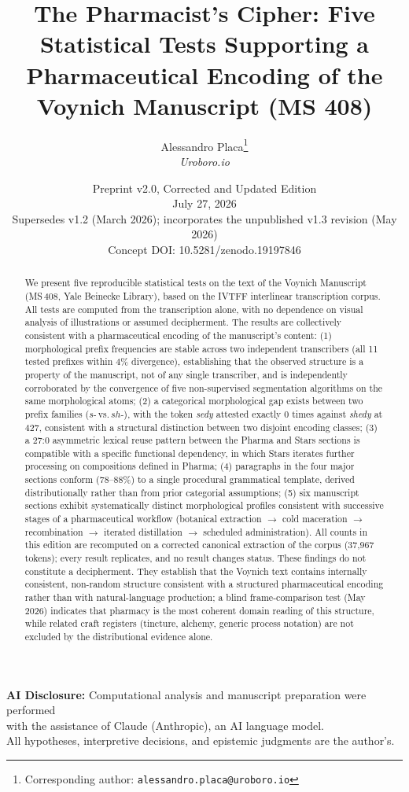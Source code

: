 \documentclass[11pt,a4paper]{article}
\title{The Pharmacist's Cipher: Five Statistical Tests Supporting a Pharmaceutical Encoding of the Voynich Manuscript (MS 408)}
\author{Alessandro Placa\thanks{Corresponding author: \texttt{alessandro.placa@uroboro.io}}\\
\textit{Uroboro.io}}
\date{Preprint v2.0, Corrected and Updated Edition\\[0.3em]
\small July 27, 2026\\[0.5em]
\small Supersedes v1.2 (March 2026); incorporates the unpublished v1.3 revision (May 2026)\\
\small Concept DOI: 10.5281/zenodo.19197846}
\begin{document}
\maketitle

\begin{center}
\small
\textbf{AI Disclosure:} Computational analysis and manuscript preparation were performed\\
with the assistance of Claude (Anthropic), an AI language model.\\
All hypotheses, interpretive decisions, and epistemic judgments are the author's.
\end{center}

\begin{abstract}
We present five reproducible statistical tests on the text of the Voynich Manuscript (MS\,408, Yale Beinecke Library), based on the IVTFF interlinear transcription corpus. All tests are computed from the transcription alone, with no dependence on visual analysis of illustrations or assumed decipherment. The results are collectively consistent with a pharmaceutical encoding of the manuscript's content: (1) morphological prefix frequencies are stable across two independent transcribers (all 11 tested prefixes within 4\% divergence), establishing that the observed structure is a property of the manuscript, not of any single transcriber, and is independently corroborated by the convergence of five non-supervised segmentation algorithms on the same morphological atoms; (2) a categorical morphological gap exists between two prefix families ($s$-\,vs.\,$sh$-), with the token \textit{sedy} attested exactly 0 times against \textit{shedy} at 427, consistent with a structural distinction between two disjoint encoding classes; (3) a 27:0 asymmetric lexical reuse pattern between the Pharma and Stars sections is compatible with a specific functional dependency, in which Stars iterates further processing on compositions defined in Pharma; (4) paragraphs in the four major sections conform (78--88\%) to a single procedural grammatical template, derived distributionally rather than from prior categorial assumptions; (5) six manuscript sections exhibit systematically distinct morphological profiles consistent with successive stages of a pharmaceutical workflow (botanical extraction $\to$ cold maceration $\to$ recombination $\to$ iterated distillation $\to$ scheduled administration). All counts in this edition are recomputed on a corrected canonical extraction of the corpus (37{,}967 tokens); every result replicates, and no result changes status. These findings do not constitute a decipherment. They establish that the Voynich text contains internally consistent, non-random structure consistent with a structured pharmaceutical encoding rather than with natural-language production; a blind frame-comparison test (May 2026) indicates that pharmacy is the most coherent domain reading of this structure, while related craft registers (tincture, alchemy, generic process notation) are not excluded by the distributional evidence alone.
\end{abstract}
\end{document}
